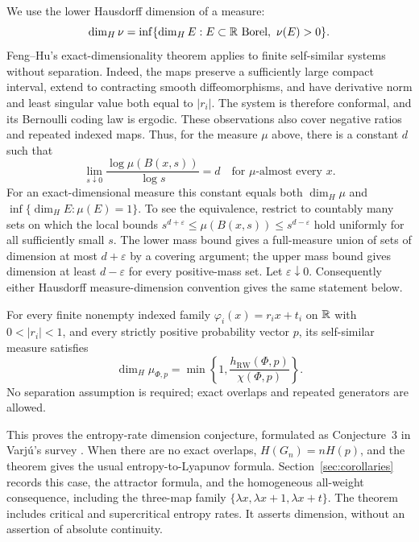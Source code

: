We use the lower Hausdorff dimension of a measure:
\[
 \dim_H\nu=\inf\{\dim_H E:E\subset\mathbb R\text{ Borel},\ \nu(E)>0\}.
\]
Feng--Hu's exact-dimensionality theorem
\cite[Theorem~2.8]{FengHu2009} applies to finite self-similar systems
without separation.  Indeed, the maps preserve a sufficiently large
compact interval, extend to contracting smooth diffeomorphisms, and have
derivative norm and least singular value both equal to $|r_i|$.
The system is therefore conformal, and its Bernoulli coding law is
ergodic.  These observations also cover negative ratios and repeated
indexed maps.  Thus, for the measure
$\mu$ above, there is a constant $d$ such that
\begin{equation}\label{eq:exact-dimensionality}
 \lim_{s\downarrow0}\frac{\log\mu(B(x,s))}{\log s}=d
 \quad\text{for $\mu$-almost every $x$}.
\end{equation}
For an exact-dimensional measure this constant equals both $\dim_H\mu$
and $\inf\{\dim_H E:\mu(E)=1\}$.
To see the equivalence, restrict to countably many sets on which the
local bounds $s^{d+\varepsilon}\le\mu(B(x,s))\le s^{d-\varepsilon}$
hold uniformly for all sufficiently small $s$.  The lower mass bound
gives a full-measure union of sets of dimension at most $d+\varepsilon$
by a covering argument; the upper mass bound gives dimension at least
$d-\varepsilon$ for every positive-mass set.  Let
$\varepsilon\downarrow0$.  Consequently either Hausdorff
measure-dimension convention gives the same statement below.

\begin{theorem}\label{thm:main}
For every finite nonempty indexed family
$\varphi_i(x)=r_i x+t_i$ on $\mathbb R$ with $0<|r_i|<1$, and every
strictly positive probability vector $p$, its self-similar measure satisfies
\[
 \dim_H\mu_{\Phi,p}
 =\min\left\{1,\frac{h_{\mathrm{RW}}(\Phi,p)}{\chi(\Phi,p)}\right\}.
\]
No separation assumption is required; exact overlaps and repeated
generators are allowed.
\end{theorem}

This proves the entropy-rate dimension conjecture, formulated as
Conjecture~3 in Varj\'u's survey \cite{VarjuSurvey2026}.
When there are no exact overlaps, $H(G_n)=nH(p)$, and the theorem
gives the usual entropy-to-Lyapunov formula.  Section~\ref{sec:corollaries}
records this case, the attractor formula, and the homogeneous all-weight
consequence, including the three-map family
$\{\lambda x,\lambda x+1,\lambda x+t\}$.
The theorem includes critical and supercritical entropy
rates.  It asserts dimension, without an assertion of absolute continuity.


